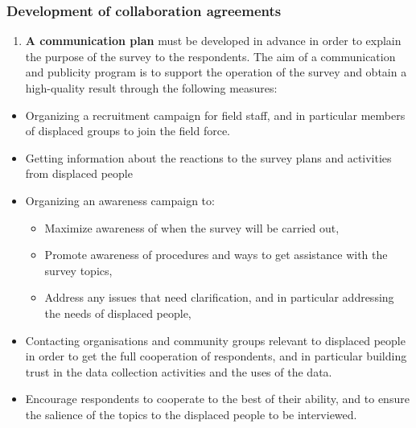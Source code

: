 \documentclass[
]{article}
\providecommand{\tightlist}{%
  \setlength{\itemsep}{0pt}\setlength{\parskip}{0pt}}
\begin{document}
\hypertarget{development-of-collaboration-agreements}{%
\subsubsection{Development of collaboration agreements}\label{development-of-collaboration-agreements}}

\begin{enumerate}
\def\labelenumi{\arabic{enumi}.}
\setcounter{enumi}{309}
\tightlist
\item
  \textbf{A communication plan} must be developed in advance in order to
  explain the purpose of the survey to the respondents. The aim of a
  communication and publicity program is to support the operation of
  the survey and obtain a high-quality result through the following
  measures:
\end{enumerate}

\begin{itemize}
\item
  Organizing a recruitment campaign for field staff, and in particular
  members of displaced groups to join the field force.
\item
  Getting information about the reactions to the survey plans and
  activities from displaced people
\item
  Organizing an awareness campaign to:

  \begin{itemize}
  \item
    Maximize awareness of when the survey will be carried out,
  \item
    Promote awareness of procedures and ways to get assistance with
    the survey topics,
  \item
    Address any issues that need clarification, and in particular
    addressing the needs of displaced people,
  \end{itemize}
\item
  Contacting organisations and community groups relevant to displaced
  people in order to get the full cooperation of respondents, and in
  particular building trust in the data collection activities and the
  uses of the data.
\item
  Encourage respondents to cooperate to the best of their ability, and
  to ensure the salience of the topics to the displaced people to be
  interviewed.
\end{itemize}
\end{document}
